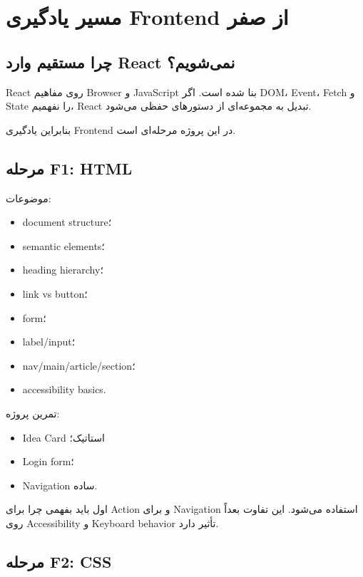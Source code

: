 
\chapter{مسیر یادگیری Frontend از صفر}

\section{چرا مستقیم وارد React نمی‌شویم؟}

React روی مفاهیم Browser و JavaScript بنا شده است. اگر DOM، Event، Fetch و State را نفهمیم، React تبدیل به مجموعه‌ای از دستورهای حفظی می‌شود.

بنابراین یادگیری Frontend در این پروژه مرحله‌ای است.

\section{مرحله F1: HTML}

موضوعات:
\begin{itemize}
  \item document structure؛
  \item semantic elements؛
  \item heading hierarchy؛
  \item link vs button؛
  \item form؛
  \item label/input؛
  \item nav/main/article/section؛
  \item accessibility basics.
\end{itemize}

تمرین پروژه:
\begin{itemize}
  \item Idea Card استاتیک؛
  \item Login form؛
  \item Navigation ساده.
\end{itemize}

\begin{learningbox}
اول باید بفهمی چرا  برای Action و  برای Navigation استفاده می‌شود. این تفاوت بعداً روی Accessibility و Keyboard behavior تأثیر دارد.
\end{learningbox}

\section{مرحله F2: CSS}

